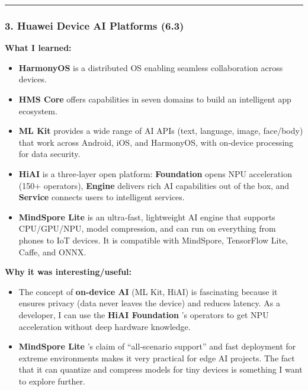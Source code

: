\begin{center}\rule{0.5\linewidth}{0.5pt}\end{center}

\hypertarget{huawei-device-ai-platforms-6.3}{%
\subsubsection{3. Huawei Device AI Platforms
(6.3)}\label{huawei-device-ai-platforms-6.3}}

\textbf{What I learned:}

\begin{itemize}
\tightlist
\item
  \textbf{HarmonyOS} is a distributed OS enabling seamless collaboration
  across devices.
\item
  \textbf{HMS Core} offers capabilities in seven domains to build an
  intelligent app ecosystem.
\item
  \textbf{ML Kit} provides a wide range of AI APIs (text, language,
  image, face/body) that work across Android, iOS, and HarmonyOS, with
  on‑device processing for data security.
\item
  \textbf{HiAI} is a three‑layer open platform: \textbf{Foundation}
  opens NPU acceleration (150+ operators), \textbf{Engine} delivers rich
  AI capabilities out of the box, and \textbf{Service} connects users to
  intelligent services.
\item
  \textbf{MindSpore Lite} is an ultra‑fast, lightweight AI engine that
  supports CPU/GPU/NPU, model compression, and can run on everything
  from phones to IoT devices. It is compatible with MindSpore,
  TensorFlow Lite, Caffe, and ONNX.
\end{itemize}

\textbf{Why it was interesting/useful:}

\begin{itemize}
\tightlist
\item
  The concept of \textbf{on‑device AI} (ML Kit, HiAI) is fascinating
  because it ensures privacy (data never leaves the device) and reduces
  latency. As a developer, I can use the \textbf{HiAI Foundation} 's
  operators to get NPU acceleration without deep hardware knowledge.
\item
  \textbf{MindSpore Lite} 's claim of ``all‑scenario support'' and fast
  deployment for extreme environments makes it very practical for edge
  AI projects. The fact that it can quantize and compress models for
  tiny devices is something I want to explore further.
\end{itemize}

